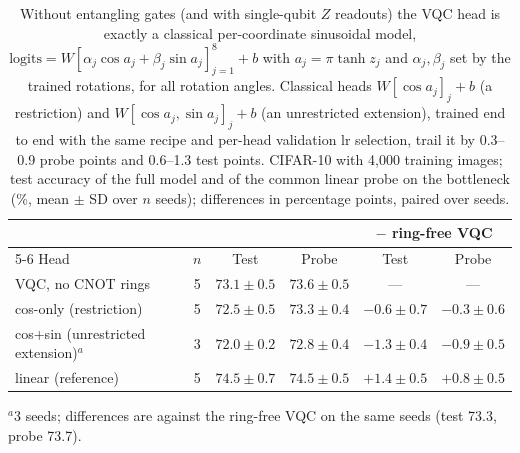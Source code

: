 \begin{table}[t]
\centering
\caption{Without entangling gates (and with single-qubit $Z$ readouts) the VQC head is exactly a classical per-coordinate sinusoidal model,
$\mathrm{logits} = W[\alpha_j\cos a_j + \beta_j\sin a_j]_{j=1}^{8} + b$ with $a_j = \pi\tanh z_j$
and $\alpha_j, \beta_j$ set by the trained rotations, for all rotation angles. Classical heads
$W[\cos a_j]_j + b$ (a restriction) and $W[\cos a_j, \sin a_j]_j + b$ (an unrestricted
extension), trained end to end with the same recipe and per-head validation lr selection,
trail it by 0.3--0.9 probe points and 0.6--1.3 test points.
CIFAR-10 with 4,000 training images; test accuracy of the full model and of the common linear
probe on the bottleneck (\%, mean $\pm$ SD over $n$ seeds); differences in percentage points,
paired over seeds.}
\label{tab:ringfree}
\small
\setlength{\tabcolsep}{4pt}
\begin{tabular}{lccccc}
\toprule
& & & & \multicolumn{2}{c}{$-$ ring-free VQC} \\
\cmidrule(lr){5-6}
Head & $n$ & Test & Probe & Test & Probe \\
\midrule
VQC, no CNOT rings & 5 & $73.1 \pm 0.5$ & $73.6 \pm 0.5$ & --- & --- \\
cos-only (restriction) & 5 & $72.5 \pm 0.5$ & $73.3 \pm 0.4$ & $-0.6 \pm 0.7$ & $-0.3 \pm 0.6$ \\
cos+sin (unrestricted extension)$^a$ & 3 & $72.0 \pm 0.2$ & $72.8 \pm 0.4$ & $-1.3 \pm 0.4$ & $-0.9 \pm 0.5$ \\
linear (reference) & 5 & $74.5 \pm 0.7$ & $74.5 \pm 0.5$ & $+1.4 \pm 0.5$ & $+0.8 \pm 0.5$ \\
\bottomrule
\end{tabular}

\smallskip
{\footnotesize $^a$3 seeds; differences are against the ring-free VQC on the same seeds (test 73.3, probe 73.7).}
\end{table}
